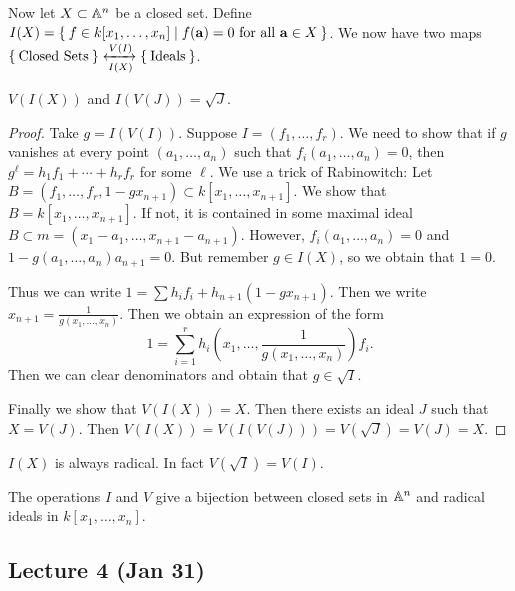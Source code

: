 \documentclass[twoside, 10pt]{article}
\begin{document}
    Now let $X \subset \mathbb{A}^n$ be a closed set. Define $I(X) = \Set{f \in k[x_1,
    \ldots, x_n] | f(\mathbf{a}) = 0 \text{ for all $\mathbf{a} \in X$}}$. We
    now have two maps $\Set{\text{Closed Sets}} \xleftrightarrow[I(X)]{V(I)}
    \Set{\text{Ideals}}$.

    \begin{thm} $V(I(X))$ and $I(V(J)) = \sqrt{J}$.
        \begin{proof} Take $g = I(V(I))$. Suppose $I = (f_1, \ldots, f_r)$. We
            need to show that if $g$ vanishes at every point $(a_1, \ldots,
            a_n)$ such that $f_i(a_1, \ldots, a_n) = 0$, then $g^{\ell} =
            h_1f_1 + \cdots + h_rf_r$ for some $\ell$. We use a trick of
            Rabinowitch: Let $B = (f_1, \ldots, f_r, 1 - gx_{n+1}) \subset
            k[x_1, \ldots, x_{n+1}]$.  We show that $B = k[x_1, \ldots,
            x_{n+1}]$. If not, it is contained in some maximal ideal $B \subset
            m = (x_1-a_1, \ldots, x_{n+1}-a_{n+1})$. However, $f_i(a_1, \ldots,
            a_n) = 0$ and $1-g(a_1, \ldots, a_n)a_{n+1} = 0$. But remember $g
            \in I(X)$, so we obtain that $1=0$.

            Thus we can write $1 = \sum h_if_i + h_{n+1}(1-gx_{n+1})$. Then we
            write $x_{n+1} = \frac{1}{g(x_1, \ldots, x_n)}$. Then we obtain an
            expression of the form \[1 = \sum_{i=1}^r h_i(x_1, \ldots,
            \frac{1}{g(x_1, \ldots, x_n)})f_i.\] Then we can clear denominators
            and obtain that $g \in \sqrt{I}$.

            Finally we show that $V(I(X)) = X$. Then there exists an ideal $J$
        such that $X=V(J)$. Then $V(I(X)) = V(I(V(J))) = V(\sqrt{J}) = V(J) =
    X$.  \end{proof} \end{thm}

    \begin{rmk} $I(X)$ is always radical. In fact $V(\sqrt{I}) = V(I)$.
    \end{rmk}

    \begin{cor} The operations $I$ and $V$ give a bijection between closed sets
    in $\mathbb{A}^n$ and radical ideals in $k[x_1, \ldots, x_n]$.  \end{cor}

    \subsection{Lecture 4 (Jan 31)}
\end{document}
